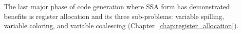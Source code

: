 The last major phase of code generation where SSA form has demonstrated benefits
is register allocation and its three sub-problems: variable spilling, variable
coloring, and variable coalescing (Chapter~\ref{chap:register_allocation}).






